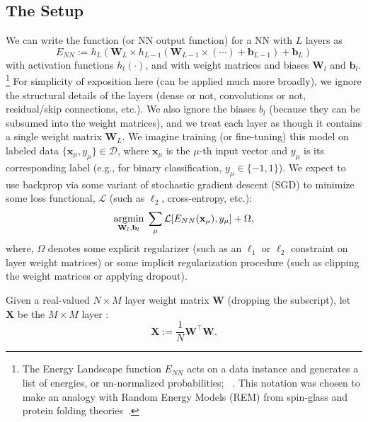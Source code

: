 \subsection{The \HTSR Setup}
\label{sxn:htsr_setup}

We can write the \EnergyLandscape function 
(or NN output function) for a 
NN with $L$ layers as
\begin{equation}
\label{eqn:dnn_energy}
E_{NN}:=h_{L}(\mathbf{W}_{L}\times h_{L-1}(\mathbf{W}_{L-1}\times(\cdots)+\mathbf{b}_{L-1})+\mathbf{b}_{L}) 
\end{equation}
with activation functions $h_{l}(\cdot)$, and with weight matrices and biases $\mathbf{W}_{l}$ and $\mathbf{b}_{l}$.%
\footnote{The Energy Landscape function $E_{NN}$ acts on a data instance and generates a list of energies, or un-normalized probabilities;
~\cite{MM18_TR_JMLRversion}.
This notation was chosen to make an analogy with Random Energy Models (REM)
from spin-glass and protein folding theories~\cite{DerridaREM1981, BryngelsonWolynesPNAS1987}.
}
For simplicity of exposition here (\HTSR can be applied much more broadly), we ignore the structural details of the layers (dense or not, convolutions or not, residual/skip connections, etc.).
We also ignore the biases $b_{l}$ (because they can be subsumed into the weight matrices),
and we treat each layer as though it contains a single weight matrix $\mathbf{W}_{L}$.
We imagine training (or fine-tuning) this model on labeled data $\{\mathbf{x}_{\mu},y_{\mu}\}\in\mathcal{D}$, where $ \mathbf{x}_\mu $ is the $\mu$-th input vector and $y_\mu$ is its corresponding label (e.g., for binary classification, $y_{\mu}\in\{-1,1\}$).
We expect to use backprop via some variant of stochastic gradient descent (SGD) to minimize some loss functional, $\mathcal{L}$ (such as $\ell_2$, cross-entropy, etc.):  
\begin{equation}
\underset{\mathbf{W}_{l},\mathbf{b}_{l}}{\text{argmin}}\;\sum_{\mu}\mathcal{L}[E_{NN}(\mathbf{x}_{\mu}),y_{\mu}]+\Omega ,
\label{eqn:dnn_opt}
\end{equation}
where, $\Omega$ denotes some explicit regularizer (such as an $\ell_1$ or $\ell_2$ constraint on layer weight matrices) or some implicit regularization procedure (such as clipping the weight matrices or applying dropout).

Given a real-valued $N\times M$ layer weight matrix $\mathbf{W}$ (dropping the subscript), let $\mathbf{X}$ be the $M \times M$ layer \emph{\CorrelationMatrix}:
\begin{equation}
\mathbf{X}:=\dfrac{1}{N}\mathbf{W}^{\top}\mathbf{W} .
\label{eqn:X}
\end{equation}

